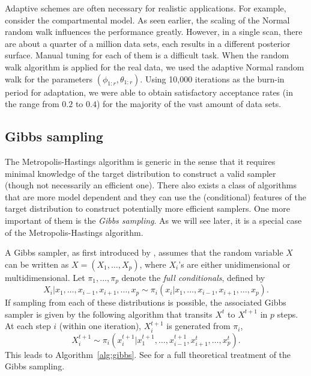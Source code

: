 Adaptive schemes are often necessary for realistic applications. For example, consider the \pet compartmental model. As seen earlier, the scaling of the Normal random walk influences the performance greatly. However, in a single \pet scan, there are about a quarter of a million data sets, each results in a different posterior surface. Manual tuning for each of them is a difficult task. When the random walk algorithm is applied for the real data, we used the adaptive Normal random walk for the parameters $(\phi_{1:r},\theta_{1:r})$. Using 10,000 iterations as the burn-in period for adaptation, we were able to obtain satisfactory acceptance rates (in the range from $0.2$ to $0.4$) for the majority of the vast amount of data sets.

\subsection{Gibbs sampling}
\label{sub:Gibbs sampling}

The Metropolis-Hastings algorithm is generic in the sense that it requires minimal knowledge of the target distribution to construct a valid sampler (though not necessarily an efficient one). There also exists a class of \mcmc algorithms that are more model dependent and they can use the (conditional) features of the target distribution to construct potentially more efficient samplers. One more important of them is the \emph{Gibbs sampling}. As we will see later, it is a special case of the Metropolis-Hastings algorithm.

A Gibbs sampler, as first introduced by \cite{Geman:1993bp}, assumes that the random variable $X$ can be written as $X = (X_1,\dots,X_p)$, where $X_i$'s are either unidimensional or multidimensional. Let $\pi_1,\dots,\pi_p$ denote the \emph{full conditionals}, defined by
\begin{equation}
  X_i|x_1,\dots,x_{i-1},x_{i+1},\dots,x_p
  \sim \pi_i(x_i|x_1,\dots,x_{i-1},x_{i+1},\dots,x_p).
\end{equation}
If sampling from each of these distributions is possible, the associated Gibbs sampler is given by the following algorithm that transits $X^t$ to $X^{t+1}$ in $p$ steps. At each step $i$ (within one iteration), $X_i^{t+1}$ is generated from $\pi_i$,
\begin{equation}
  X_i^{t+1} \sim
  \pi_i(x_i^{t+1}|x_1^{t+1},\dots,x_{i-1}^{t+1},x_{i+1}^t,\dots,x_p^t).
\end{equation}
This leads to Algorithm~\ref{alg:gibbs}. See \cite[][chap.~9 and~10]{Robert:2004tn} for a full theoretical treatment of the Gibbs sampling.

